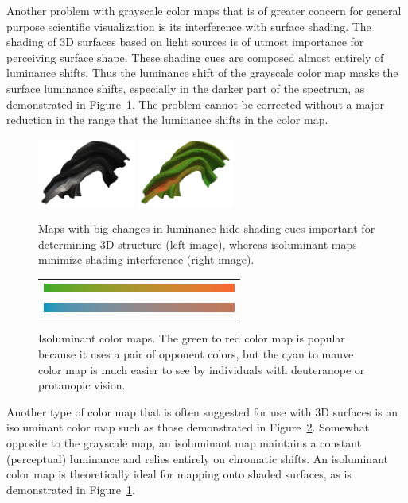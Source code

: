 \documentclass[twocolumn]{article}
\begin{document}
Another problem with grayscale color maps that is of greater concern for
general purpose scientific visualization is its interference with surface
shading.  The shading of 3D surfaces based on light sources is of utmost
importance for perceiving surface shape.  These shading cues are
composed almost entirely of luminance shifts.  Thus the luminance shift of
the grayscale color map masks the surface luminance shifts, especially in
the darker part of the spectrum, as demonstrated in
Figure~\ref{fig:LuminanceVsShading}.  The problem cannot be corrected
without a major reduction in the range that the luminance shifts in the color
map.

\begin{figure}
  \centering
  \includegraphics[width=1.25in]{images/GrayscaleShading}
  \includegraphics[width=1.25in]{images/IsoluminantShading}
  \caption{Maps with big changes in luminance hide shading cues important
    for determining 3D structure (left image), whereas isoluminant maps
    minimize shading interference (right image).}
  \label{fig:LuminanceVsShading}
\end{figure}

\begin{figure}
  \centering
  \begin{tabular}{c}
    \includegraphics[width=2.5in]{images/Green2RedBar} \\
    \includegraphics[width=2.5in]{images/Cyan2MauveBar}
  \end{tabular}
  \caption{Isoluminant color maps.  The green to red color map is popular
    because it uses a pair of opponent colors, but the cyan to mauve color
    map is much easier to see by individuals with deuteranope or protanopic
    vision.}
  \label{fig:IsoluminantColorMap}
\end{figure}
Another type of color map that is often suggested for use with 3D surfaces
is an isoluminant color map such as those demonstrated in
Figure~\ref{fig:IsoluminantColorMap}.  Somewhat opposite to the grayscale
map, an isoluminant map maintains a constant (perceptual) luminance and
relies entirely on chromatic shifts.  An isoluminant color map is
theoretically ideal for mapping onto shaded surfaces, as is demonstrated in
Figure~\ref{fig:LuminanceVsShading}.
\end{document}
